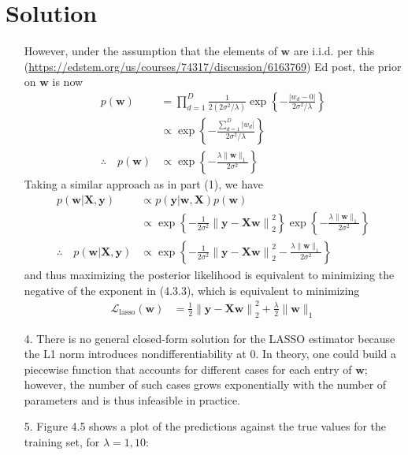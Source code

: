 \documentclass[submit]{../harvardml}
\newenvironment{solution}
  {\color{blue}\section*{Solution}}
{}
\begin{document}
\begin{solution}
\begin{enumerate}
    However, under the assumption that the elements of $\mathbf{w}$ are i.i.d. per this (\url{https://edstem.org/us/courses/74317/discussion/6163769}) Ed post, the prior on $\mathbf{w}$ is now
    \begin{align*}
        p(\mathbf{w}) &= \prod_{d=1}^D \frac{1}{2\left(2\sigma^2/\lambda\right)}\exp \left\{ -\frac{\left\lvert w_d - 0 \right\rvert}{2\sigma^2/\lambda} \right\} \\
        &\propto \exp \left\{ -\frac{\sum_{d=1}^D \lvert w_d \rvert}{2\sigma^2/\lambda} \right\} \\
        \therefore \quad p(\mathbf{w}) &\propto \exp \left\{ -\frac{\lambda \lVert \mathbf{w} \rVert_1}{2\sigma^2} \right\} \tag*{(4.3.2)}
    \end{align*}
    Taking a similar approach as in part (1), we have
    \begin{align*}
        p(\mathbf{w}|\mathbf{X},\mathbf{y}) &\propto p(\mathbf{y}|\mathbf{w},\mathbf{X})p(\mathbf{w}) \\
        &\propto \exp \left\{ -\frac{1}{2\sigma^2}\left\lVert \mathbf{y} - \mathbf{X}\mathbf{w}  \right\rVert_2^2 \right\} \exp \left\{ -\frac{\lambda \lVert \mathbf{w} \rVert_1}{2\sigma^2} \right\} \\
        \therefore \quad p(\mathbf{w}|\mathbf{X},\mathbf{y}) &\propto \exp \left\{ -\frac{1}{2\sigma^2}\left\lVert \mathbf{y} - \mathbf{X}\mathbf{w}  \right\rVert_2^2 - \frac{\lambda \lVert \mathbf{w} \rVert_1}{2\sigma^2} \right\} \tag*{(4.3.3)}
    \end{align*}
    and thus maximizing the posterior likelihood is equivalent to minimizing the negative of the exponent in (4.3.3), which is equivalent to minimizing
    \begin{align*}
        \mathcal{L}_\text{lasso}(\mathbf{w}) &= \frac{1}{2}\left\lVert \mathbf{y} - \mathbf{X}\mathbf{w}  \right\rVert_2^2 + \frac{\lambda}{2} \lVert \mathbf{w} \rVert_1 \tag*{(4.3.4)}
    \end{align*}
    \item[4.] There is no general closed-form solution for the LASSO estimator because the L1 norm introduces nondifferentiability at 0. In theory, one could build a piecewise function that accounts for different cases for each entry of $\mathbf{w}$; however, the number of such cases grows exponentially with the number of parameters and is thus infeasible in practice.
    \clearpage
    \item[5.] Figure 4.5 shows a plot of the predictions against the true values for the training set, for $\lambda = 1,10$:

\end{enumerate}
\end{solution}
\end{document}
